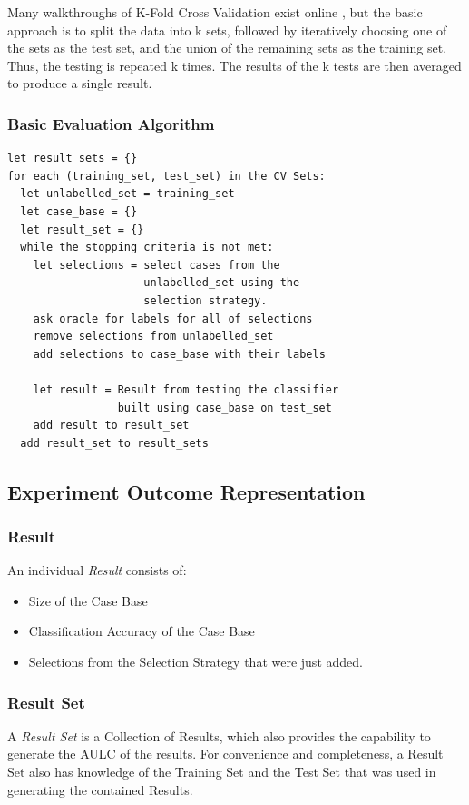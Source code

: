 \documentclass[a4paper,11pt]{report}
\begin{document}
Many walkthroughs of K-Fold Cross Validation exist online \citep{web:kfolddemo}, but the basic approach is to split the data into k sets, followed by iteratively choosing one of the sets as the test set, and the union of the remaining sets as the training set. Thus, the testing is repeated k times. The results of the k tests are then averaged to produce a single result.

\subsubsection{Basic Evaluation Algorithm}
\begin{samepage}
\begin{verbatim}
let result_sets = {}
for each (training_set, test_set) in the CV Sets:
  let unlabelled_set = training_set
  let case_base = {}
  let result_set = {}
  while the stopping criteria is not met:
    let selections = select cases from the 
                     unlabelled_set using the 
                     selection strategy.
    ask oracle for labels for all of selections
    remove selections from unlabelled_set
    add selections to case_base with their labels
  
    let result = Result from testing the classifier
                 built using case_base on test_set
    add result to result_set
  add result_set to result_sets
\end{verbatim}
\end{samepage}

\subsection{Experiment Outcome Representation}
\subsubsection{Result}
An individual \emph{Result} consists of:
\begin{itemize}
	\item Size of the Case Base
	\item Classification Accuracy of the Case Base
	\item Selections from the Selection Strategy that were just added.
\end{itemize}

\subsubsection{Result Set}
A \emph{Result Set} is a Collection of Results, which also provides the capability to generate the AULC of the results. For convenience and completeness, a Result Set also has knowledge of the Training Set and the Test Set that was used in generating the contained Results.
\end{document}
